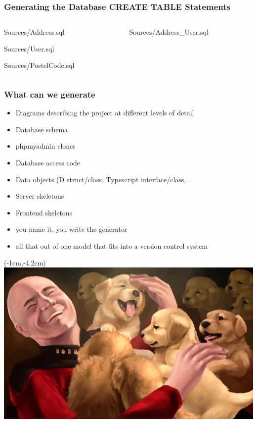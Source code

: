 \documentclass[xelatex,13pt]{beamer}
\begin{document}
\begin{frame}
	\frametitle{Generating the Database CREATE TABLE Statements}
	\begin{columns}[T]
		\begin{column}{0.49\linewidth}
	
		{Sources/Address.sql}
	
			{Sources/User.sql}
	
			{Sources/PostelCode.sql}
		\end{column}
		\begin{column}{0.49\linewidth}
	
			{Sources/Address_User.sql}
		\end{column}
		
	\end{columns}
\end{frame}

\begin{frame}
	\frametitle{What can we generate}
	\begin{itemize}
		\item Diagrams describing the project at different levels of detail
		\item Database schema
		\item phpmyadmin clones
		\item Database access code
		\item Data objects (D struct/class, Typescript interface/class, \(\dots\)
		\item Server skeletons
		\item Frontend skeletons
			\pause
		\item you name it\pause, you write the generator
			\pause
		\item all that out of one model that fits into a version control
			system
	\end{itemize}
\end{frame}

\begin{frame}[plain]
\begin{textblock*}{0cm}(-1cm,-4.2cm)
	\includegraphics[width=1.0\paperwidth]{picardpuppy.png}
\end{textblock*}
\end{frame}
\end{document}
